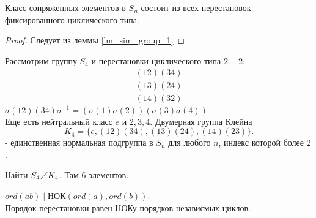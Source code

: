 \documentclass[12pt]{report}
\begin{document}
\begin{thm}
    Класс сопряженных элементов в $S_n$ состоит из всех перестановок  фиксированного циклического типа.
\end{thm}
\begin{proof}
    Следует из леммы \ref{lm_sim_group_1}
\end{proof}
\begin{ex}
   Рассмотрим группу $S_4$ и перестановки циклического типа $2+2$: 
    \[
   \begin{array}{c}
       (12)(34)\\
       (13)(24)\\
       (14)(32)
   \end{array}
   \] 
   $\sigma (12)(34) \sigma ^{-1} = (\sigma (1) \sigma (2))(\sigma (3) \sigma (4))$\\
   Еще есть нейтральный класс $e$ и $2, 3, 4$.
   Двумерная группа Клейна
   \[
      K_4 =  \{e, (12)(34), (13)(24), (14)(23)\}
   .\]  - единственная нормальная подгруппа в $S_n$ для любого $n$, индекс которой более $2$.
\end{ex}
\begin{probl}
    Найти $S_4 \diagup K_4$.  Там 6 элементов.
\end{probl}
\begin{st}
    $ord(ab) \mid НОК(ord(a), ord(b))$. \\
    Порядок перестановки равен НОКу порядков независмых циклов.
\end{st}
\end{document}
